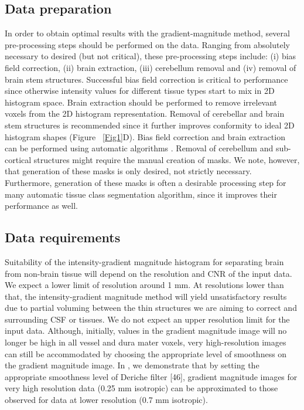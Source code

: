 \subsection{Data preparation}
In order to obtain optimal results with the gradient-magnitude method, several pre-processing steps should be performed on the data. Ranging from absolutely necessary to desired (but not critical), these pre-processing steps include: (i) bias field correction, (ii) brain extraction, (iii) cerebellum removal and (iv) removal of brain stem structures. Successful bias field correction is critical to performance since otherwise intensity values for different tissue types start to mix in 2D histogram space. Brain extraction should be performed to remove irrelevant voxels from the 2D histogram representation. Removal of cerebellar and brain stem structures is recommended since it further improves conformity to ideal 2D histogram shapes (Figure ~\ref{Fig1}D). Bias field correction and brain extraction can be performed using automatic algorithms \parencite{Smith2002, Ashburner2005}. Removal of cerebellum and sub-cortical structures might require the manual creation of masks. We note, however, that generation of these masks is only desired, not strictly necessary. Furthermore, generation of these masks is often a desirable processing step for many automatic tissue class segmentation algorithm, since it improves their performance as well.

\subsection{Data requirements}
Suitability of the intensity-gradient magnitude histogram for separating brain from non-brain tissue will depend on the resolution and CNR of the input data. We expect a lower limit of resolution around 1 mm. At resolutions lower than that, the intensity-gradient magnitude method will yield unsatisfactory results due to partial voluming between the thin structures we are aiming to correct and surrounding CSF or tissues. We do not expect an upper resolution limit for the input data. Although, initially, values in the gradient magnitude image will no longer be high in all vessel and dura mater voxels, very high-resolution images can still be accommodated by choosing the appropriate level of smoothness on the gradient magnitude image. In , we demonstrate that by setting the appropriate smoothness level of Deriche filter [46], gradient magnitude images for very high resolution data (0.25 mm isotropic) \parencite{250micron_data, Lusebrink2017} can be approximated to those observed for data at lower resolution (0.7 mm isotropic).

